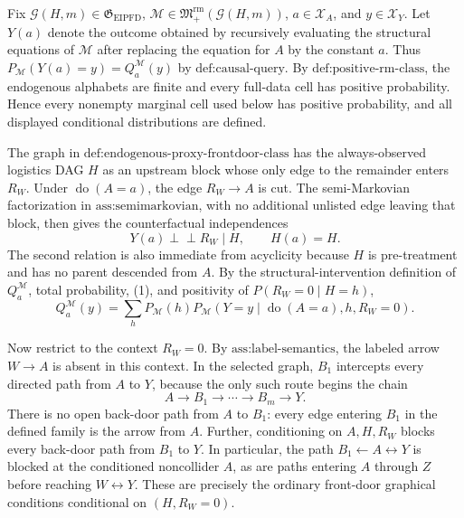 Fix \(\mathcal G(H,m)\in\mathfrak G_{\mathrm{EIPFD}}\), \(\mathcal M\in\mathfrak M_{+}^{\mathrm{rm}}(\mathcal G(H,m))\), \(a\in\mathcal X_A\), and \(y\in\mathcal X_Y\).  Let \(Y(a)\) denote the outcome obtained by recursively evaluating the structural equations of \(\mathcal M\) after replacing the equation for \(A\) by the constant \(a\).  Thus \(P_{\mathcal M}(Y(a)=y)=Q_a^{\mathcal M}(y)\) by \(\text{def:causal-query}\).  By \(\text{def:positive-rm-class}\), the endogenous alphabets are finite and every full-data cell has positive probability.  Hence every nonempty marginal cell used below has positive probability, and all displayed conditional distributions are defined.

The graph in \(\text{def:endogenous-proxy-frontdoor-class}\) has the always-observed logistics DAG \(H\) as an upstream block whose only edge to the remainder enters \(R_W\).  Under \(\operatorname{do}(A=a)\), the edge \(R_W\to A\) is cut.  The semi-Markovian factorization in \(\text{ass:semimarkovian}\), with no additional unlisted edge leaving that block, then gives the counterfactual independences
\[
Y(a)\mathbin{\perp\!\!\!\perp}R_W\mid H,
\qquad
H(a)=H.
\tag{1}
\]
The second relation is also immediate from acyclicity because \(H\) is pre-treatment and has no parent descended from \(A\).  By the structural-intervention definition of \(Q_a^{\mathcal M}\), total probability, (1), and positivity of \(P(R_W=0\mid H=h)\),
\[
Q_a^{\mathcal M}(y)
=\sum_hP_{\mathcal M}(h)
P_{\mathcal M}(Y=y\mid\operatorname{do}(A=a),h,R_W=0).
\tag{2}
\]

Now restrict to the context \(R_W=0\).  By \(\text{ass:label-semantics}\), the labeled arrow \(W\to A\) is absent in this context.  In the selected graph, \(B_1\) intercepts every directed path from \(A\) to \(Y\), because the only such route begins the chain
\[
A\to B_1\to\cdots\to B_m\to Y.
\tag{3}
\]
There is no open back-door path from \(A\) to \(B_1\): every edge entering \(B_1\) in the defined family is the arrow from \(A\).  Further, conditioning on \(A,H,R_W\) blocks every back-door path from \(B_1\) to \(Y\).  In particular, the path \(B_1\leftarrow A\leftrightarrow Y\) is blocked at the conditioned noncollider \(A\), as are paths entering \(A\) through \(Z\) before reaching \(W\leftrightarrow Y\).  These are precisely the ordinary front-door graphical conditions conditional on \((H,R_W=0)\).

